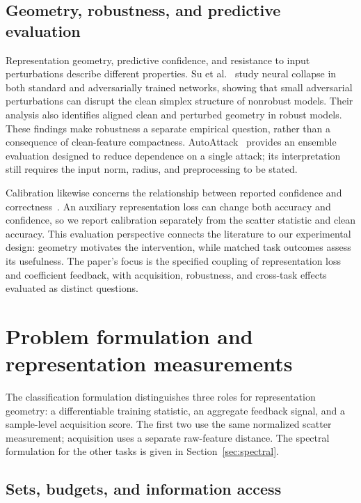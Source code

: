 \documentclass[10pt,a4paper,twocolumn]{article}
\begin{document}
\subsection{Geometry, robustness, and predictive evaluation}
\label{sec:related_evaluation}

Representation geometry, predictive confidence, and resistance to input
perturbations describe different properties. Su et
al.~\cite{su2024robustcollapse} study neural collapse in both standard
and adversarially trained networks, showing that small adversarial
perturbations can disrupt the clean simplex structure of nonrobust
models. Their analysis also identifies aligned clean and perturbed
geometry in robust models. These findings make robustness a separate
empirical question, rather than a consequence of clean-feature
compactness. AutoAttack~\cite{croce2020autoattack} provides an ensemble
evaluation designed to reduce dependence on a single attack; its
interpretation still requires the input norm, radius, and preprocessing
to be stated.

Calibration likewise concerns the relationship between reported
confidence and correctness~\cite{guo2017calibration}. An auxiliary
representation loss can change both accuracy and confidence, so we
report calibration separately from the scatter statistic and clean
accuracy. This evaluation perspective connects the literature to our
experimental design: geometry motivates the intervention, while
matched task outcomes assess its usefulness. The paper's focus is the
specified coupling of representation loss and coefficient feedback,
with acquisition, robustness, and cross-task effects evaluated as
distinct questions.


\section{Problem formulation and representation measurements}
\label{sec:geometry}

The classification formulation distinguishes three roles for representation
geometry: a differentiable training statistic, an aggregate feedback signal,
and a sample-level acquisition score. The first two use the same normalized
scatter measurement; acquisition uses a separate raw-feature distance.
The spectral formulation for the other tasks is given in
Section~\ref{sec:spectral}.

\subsection{Sets, budgets, and information access}
\end{document}
